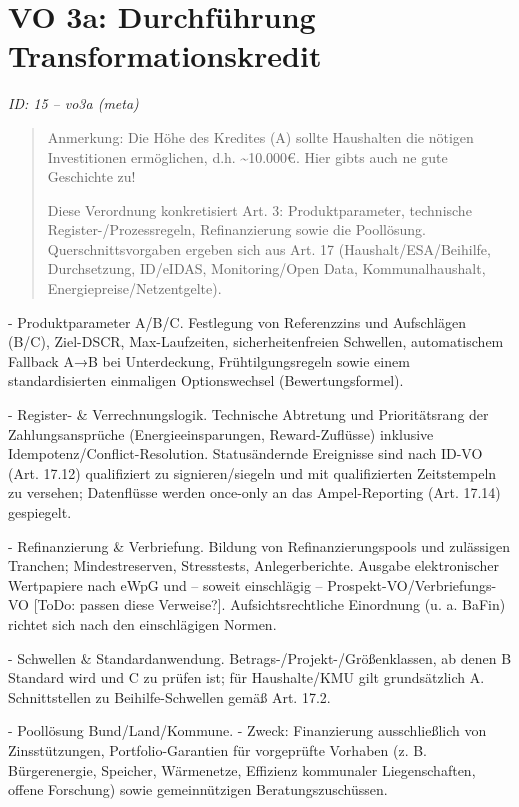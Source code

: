 \documentclass[12pt,a4paper]{scrartcl}
\begin{document}
\section[VO 3a: Durchführung Transformationskredit]{VO 3a: Durchführung Transformationskredit}
\noindent\textit{ID: 15 -- vo3a (meta)}

\begin{quote}
Anmerkung: Die Höhe des Kredites (A) sollte Haushalten die nötigen Investitionen ermöglichen, d.h. \textasciitilde{}10.000€. Hier gibts auch ne gute Geschichte zu!

  
  Diese Verordnung konkretisiert Art. 3: Produktparameter, technische Register-/Prozessregeln, Refinanzierung sowie die Poollösung. Querschnittsvorgaben ergeben sich aus Art. 17 (Haushalt/ESA/Beihilfe, Durchsetzung, ID/eIDAS, Monitoring/Open Data, Kommunalhaushalt, Energiepreise/Netzentgelte).
\end{quote}

- Produktparameter A/B/C. Festlegung von Referenzzins und Aufschlägen (B/C), Ziel-DSCR, Max-Laufzeiten, sicherheitenfreien Schwellen, automatischem Fallback A→B bei Unterdeckung, Frühtilgungsregeln sowie einem standardisierten einmaligen Optionswechsel (Bewertungsformel).

- Register- \& Verrechnungslogik. Technische Abtretung und Prioritätsrang der Zahlungsansprüche (Energieeinsparungen, Reward-Zuflüsse) inklusive Idempotenz/Conflict-Resolution. Statusändernde Ereignisse sind nach ID-VO (Art. 17.12) qualifiziert zu signieren/siegeln und mit qualifizierten Zeitstempeln zu versehen; Datenflüsse werden once-only an das Ampel-Reporting (Art. 17.14) gespiegelt.

- Refinanzierung \& Verbriefung. Bildung von Refinanzierungspools und zulässigen Tranchen; Mindestreserven, Stresstests, Anlegerberichte. Ausgabe elektronischer Wertpapiere nach eWpG und -- soweit einschlägig -- Prospekt-VO/Verbriefungs-VO [ToDo: passen diese Verweise?]. Aufsichtsrechtliche Einordnung (u. a. BaFin) richtet sich nach den einschlägigen Normen.

- Schwellen \& Standardanwendung. Betrags-/Projekt-/Größenklassen, ab denen B Standard wird und C zu prüfen ist; für Haushalte/KMU gilt grundsätzlich A. Schnittstellen zu Beihilfe-Schwellen gemäß Art. 17.2.

- Poollösung Bund/Land/Kommune.
- Zweck: Finanzierung ausschließlich von Zinsstützungen, Portfolio-Garantien für vorgeprüfte Vorhaben (z. B. Bürgerenergie, Speicher, Wärmenetze, Effizienz kommunaler Liegenschaften, offene Forschung) sowie gemeinnützigen Beratungszuschüssen.
\end{document}
